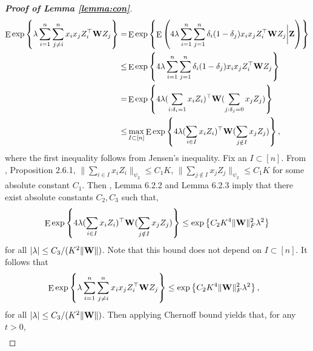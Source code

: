 \documentclass[11pt]{article}
\DeclareMathOperator{\myE}{E}
\theoremstyle{plain}
\theoremstyle{definition}
\theoremstyle{remark}
\begin{document}
\begin{appendices}
\begin{proof}[\textbf{Proof of Lemma \ref{lemma:con}}]
\begin{equation*}
    \begin{split}
    \myE
    \exp
    \left\{
        \lambda
 \sum_{i=1}^{n} \sum_{j\neq i}^n
 x_i x_j Z_i^\top \BW Z_j  
 \right\}
 =&
    \myE
    \exp
    \left\{
        \myE\left(
            4
        \lambda
 \sum_{i=1}^{n} \sum_{j=1}^n
 \delta_i (1-\delta_j) x_i x_j Z_i^\top \BW Z_j  
 \bigg | \BZ \right)
 \right\}
 \\
 \leq &
        \myE
    \exp
    \left\{
            4
        \lambda
 \sum_{i=1}^{n} \sum_{j=1}^n
 \delta_i (1-\delta_j) x_i x_j Z_i^\top \BW Z_j  
 \right\}
 \\
 = &
        \myE
    \exp
    \left\{
            4
        \lambda
        (\sum_{i:\delta_i=1} x_i Z_i)^\top \BW
         (\sum_{j:\delta_j=0}
         x_j  Z_j  )
 \right\}
 \\
 \leq&
 \max_{I\subset [n]}
        \myE
    \exp
    \left\{
            4
        \lambda
        (\sum_{i\in I}x_i  Z_i)^\top \BW (\sum_{j\notin I}x_j Z_j  )
 \right\},
    \end{split}
\end{equation*}
where the first inequality follows from Jensen's inequality.
Fix an $I\subset [n]$.
From \cite{Roman2018}, Proposition 2.6.1, $\|\sum_{ i \in I} x_i Z_i\|_{\psi_2}\leq C_1 K$, $\|\sum_{ j \notin I} x_j Z_j\|_{\psi_2}\leq C_1 K$ for some absolute constant $C_1$.
Then \cite{Roman2018}, Lemma 6.2.2 and Lemma 6.2.3 imply that
there exist absolute constants $C_2,C_3$ such that, 
\begin{equation*}
        \myE
    \exp
    \left\{
            4
        \lambda
        (\sum_{i\in I}x_i  Z_i)^\top \BW (\sum_{j\notin I}x_j Z_j  )
 \right\}
 \leq
 \exp
 \left\{
     C_2 K^4
 \|\BW\|_F^2
     \lambda^2 
 \right\}
\end{equation*}
for all 
$|\lambda|\leq {C_3}/{(K^2\|\mathbf{W}\|)}$.
Note that this bound does not depend on $I\subset [n]$.
It follows that
\begin{equation*}
    \begin{split}
    &\myE
    \exp
    \left\{
        \lambda
 \sum_{i=1}^{n} \sum_{j\neq i}^n
 x_i x_j Z_i^\top \BW Z_j  
 \right\}
 \leq 
\exp\left\{
    C_2 K^4 \|\BW\|_F^2 \lambda^2
\right\}
,
    \end{split}
\end{equation*}
for all $|\lambda|\leq {C_3}/{( K^2 \|\mathbf{W}\|)}$.
Then applying Chernoff bound yields that, for any $t>0$,
\begin{equation*}
    \begin{split}

\end{split}
\end{equation*}
\end{proof}
\end{appendices}
\end{document}
